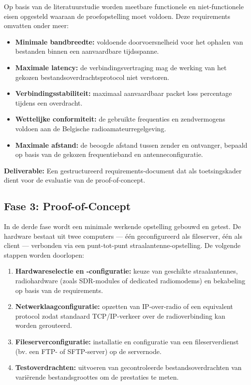 Op basis van de literatuurstudie worden meetbare functionele en niet-functionele eisen opgesteld waaraan de proefopstelling moet voldoen. Deze requirements omvatten onder meer:

\begin{itemize}
  \item \textbf{Minimale bandbreedte:} voldoende doorvoersnelheid voor het ophalen van bestanden binnen een aanvaardbare tijdsspanne.
  \item \textbf{Maximale latency:} de verbindingsvertraging mag de werking van het gekozen bestandsoverdrachtsprotocol niet verstoren.
  \item \textbf{Verbindingsstabiliteit:} maximaal aanvaardbaar packet loss percentage tijdens een overdracht.
  \item \textbf{Wettelijke conformiteit:} de gebruikte frequenties en zendvermogens voldoen aan de Belgische radioamateurregelgeving.
  \item \textbf{Maximale afstand:} de beoogde afstand tussen zender en ontvanger, bepaald op basis van de gekozen frequentieband en antenneconfiguratie.
\end{itemize}

\textbf{Deliverable:} Een gestructureerd requirements-document dat als toetsingskader dient voor de evaluatie van de proof-of-concept.

\subsection{Fase 3: Proof-of-Concept}

In de derde fase wordt een minimale werkende opstelling gebouwd en getest. De hardware bestaat uit twee computers — één geconfigureerd als fileserver, één als client — verbonden via een punt-tot-punt straalantenne-opstelling. De volgende stappen worden doorlopen:

\begin{enumerate}
  \item \textbf{Hardwareselectie en -configuratie:} keuze van geschikte straalantennes, radiohardware (zoals SDR-modules of dedicated radiomodems) en bekabeling op basis van de requirements.
  \item \textbf{Netwerklaagconfiguratie:} opzetten van IP-over-radio of een equivalent protocol zodat standaard TCP/IP-verkeer over de radioverbinding kan worden gerouteerd.
  \item \textbf{Fileserverconfiguratie:} installatie en configuratie van een fileserverdienst (bv. een FTP- of SFTP-server) op de servernode.
  \item \textbf{Testoverdrachten:} uitvoeren van gecontroleerde bestandsoverdrachten van variërende bestandsgroottes om de prestaties te meten.
\end{enumerate}

